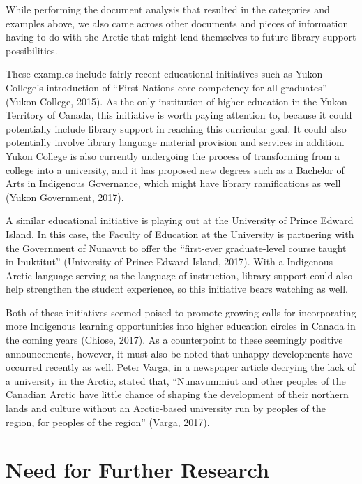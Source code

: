 \documentclass[a4paper,
fontsize=11pt,
oneside,
numbers=noperiodatend,
parskip=half-,
bibliography=totoc,
final
]{scrartcl}
\begin{document}
While performing the document analysis that resulted in the categories
and examples above, we also came across other documents and pieces of
information having to do with the Arctic that might lend themselves to
future library support possibilities.

These examples include fairly recent educational initiatives such as
Yukon College's introduction of \enquote{First Nations core competency
for all graduates} (Yukon College, 2015). As the only institution of
higher education in the Yukon Territory of Canada, this initiative is
worth paying attention to, because it could potentially include library
support in reaching this curricular goal. It could also potentially
involve library language material provision and services in addition.
Yukon College is also currently undergoing the process of transforming
from a college into a university, and it has proposed new degrees such
as a Bachelor of Arts in Indigenous Governance, which might have library
ramifications as well (Yukon Government, 2017).

A similar educational initiative is playing out at the University of
Prince Edward Island. In this case, the Faculty of Education at the
University is partnering with the Government of Nunavut to offer the
\enquote{first-ever graduate-level course taught in Inuktitut}
(University of Prince Edward Island, 2017). With a Indigenous Arctic
language serving as the language of instruction, library support could
also help strengthen the student experience, so this initiative bears
watching as well.

Both of these initiatives seemed poised to promote growing calls for
incorporating more Indigenous learning opportunities into higher
education circles in Canada in the coming years (Chiose, 2017). As a
counterpoint to these seemingly positive announcements, however, it must
also be noted that unhappy developments have occurred recently as well.
Peter Varga, in a newspaper article decrying the lack of a university in
the Arctic, stated that, \enquote{Nunavummiut and other peoples of the
Canadian Arctic have little chance of shaping the development of their
northern lands and culture without an Arctic-based university run by
peoples of the region, for peoples of the region} (Varga, 2017).

\hypertarget{need-for-further-research}{%
\section{Need for Further Research}\label{need-for-further-research}}
\end{document}
